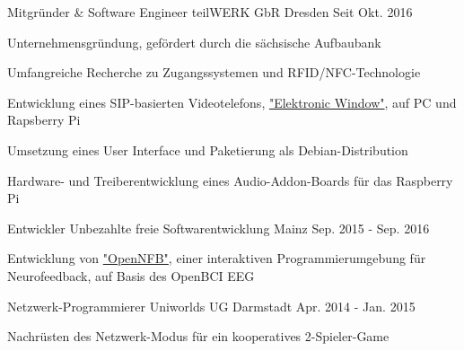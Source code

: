 
\begin{cventries}

  \cventry
    {Mitgründer \& Software Engineer} %
    {teilWERK GbR} %
    {Dresden} %
    {Seit Okt. 2016} %
    {
      \begin{cvitems} %
        \item {Unternehmensgründung, gefördert durch die sächsische Aufbaubank}
        \item {Umfangreiche Recherche zu Zugangssystemen und RFID/NFC-Technologie}
        \item {Entwicklung eines SIP-basierten Videotelefons, \href{https://ewindow.org}{"Elektronic Window"}, auf PC und Rapsberry Pi}
        \item {Umsetzung eines User Interface und Paketierung als Debian-Distribution }
        \item {Hardware- und Treiberentwicklung eines Audio-Addon-Boards für das Raspberry Pi}
      \end{cvitems}
    }

  \cventry
    {Entwickler} %
    {Unbezahlte freie Softwarentwicklung} %
    {Mainz} %
    {Sep. 2015 - Sep. 2016} %
    {
      \begin{cvitems} %
        \item {Entwicklung von \href{https://github.com/strfry/OpenNFB}{"OpenNFB"}, einer interaktiven Programmierumgebung für Neurofeedback, auf Basis des OpenBCI EEG}
      \end{cvitems}
    }

  \cventry
    {Netzwerk-Programmierer} %
    {Uniworlds UG} %
    {Darmstadt} %
    {Apr. 2014 - Jan. 2015} %
    {
      \begin{cvitems} %
        \item {Nachrüsten des Netzwerk-Modus für ein kooperatives 2-Spieler-Game}
      \end{cvitems}
    }


\end{cventries}
